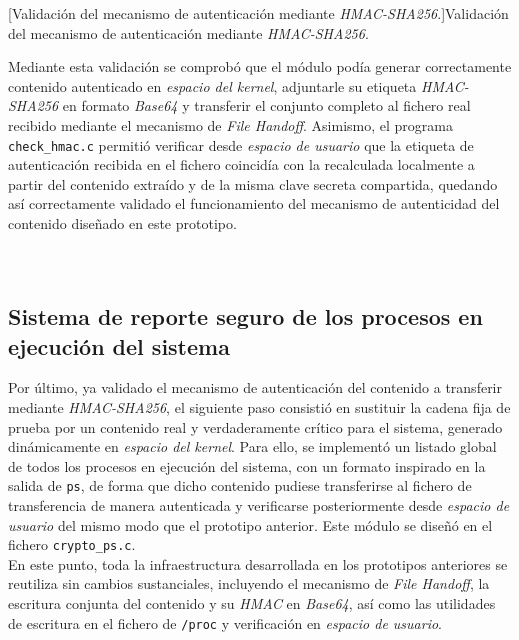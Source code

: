 \captionsetup{type=code,justification=centering,singlelinecheck=false}
[Validación del mecanismo de autenticación mediante \textit{HMAC-SHA256}.]{Validación del mecanismo de autenticación mediante \textit{HMAC-SHA256}.}
\label{cod:crypto_validation}
\vspace{\baselineskip}

Mediante esta validación se comprobó que el módulo podía generar correctamente contenido autenticado en \textit{espacio del kernel}, adjuntarle su etiqueta \textit{HMAC-SHA256} en formato \textit{Base64} y transferir el conjunto completo al fichero real recibido mediante el mecanismo de \textit{File Handoff}.
Asimismo, el programa \verb|check_hmac.c| permitió verificar desde \textit{espacio de usuario} que la etiqueta de autenticación recibida en el fichero coincidía con la recalculada localmente a partir del contenido extraído y de la misma clave secreta compartida, quedando así correctamente validado el funcionamiento del mecanismo de autenticidad del contenido diseñado en este prototipo.\\\\

\

\subsection{Sistema de reporte seguro de los procesos en ejecución del sistema}
\label{sec:proto-report}

Por último, ya validado el mecanismo de autenticación del contenido a transferir mediante \textit{HMAC-SHA256}, el siguiente paso consistió en sustituir la cadena fija de prueba por un contenido real y verdaderamente crítico para el sistema, generado dinámicamente en \textit{espacio del kernel}.
Para ello, se implementó un listado global de todos los procesos en ejecución del sistema, con un formato inspirado en la salida de \texttt{ps}, de forma que dicho contenido pudiese transferirse al fichero de transferencia de manera autenticada y verificarse posteriormente desde \textit{espacio de usuario} del mismo modo que el prototipo anterior.
Este módulo se diseñó en el fichero \verb|crypto_ps.c|.\\

En este punto, toda la infraestructura desarrollada en los prototipos anteriores se reutiliza sin cambios sustanciales, incluyendo el mecanismo de \textit{File Handoff}, la escritura conjunta del contenido y su \textit{HMAC} en \textit{Base64}, así como las utilidades de escritura en el fichero de \texttt{/proc} y verificación en \textit{espacio de usuario}.\\

